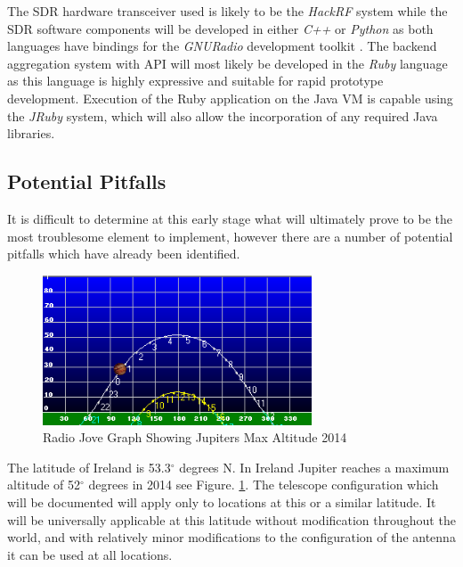 \documentclass[runningheads,a4paper]{llncs}
\begin{document}
The \gls{SDR} hardware transceiver used is likely to be the \textit{HackRF} system while the \gls{SDR} software components will be developed in either \textit{C++} or \textit{Python} as both languages have bindings for the \textit{GNURadio} development toolkit \citep{gnuradio-14}. The backend aggregation system with API will most likely be developed in the \textit{Ruby} language as this language is highly expressive and suitable for rapid prototype development. Execution of the Ruby application on the Java VM is capable using the \textit{JRuby} system, which will also allow the incorporation of any required Java libraries.


\subsection*{Potential Pitfalls}

It is difficult to determine at this early stage what will ultimately prove to be the most troublesome element to implement, however there are a number of potential pitfalls which have already been identified.

%
\begin{figure}[here]
\centering
\includegraphics[width=8cm]{images/11}
\caption{Radio Jove Graph Showing Jupiters Max Altitude 2014 \citep{rjp-14}}
\label{fig:jupiter_max_altitude_2014}
\end{figure}
%

The latitude of Ireland is 53.3$^{\circ}$ degrees N. In Ireland Jupiter reaches a maximum altitude of 52$^{\circ}$ degrees in 2014 see Figure. \ref{fig:jupiter_max_altitude_2014}. The telescope configuration which will be documented will apply only to locations at this or a similar latitude. It will be universally applicable at this latitude without modification throughout the world, and with relatively minor modifications to the configuration of the antenna it can be used at all locations. \cite{nasa12}
\end{document}
